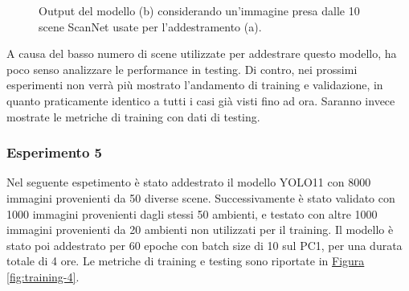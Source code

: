 \documentclass[12pt]{report}
\begin{document}
\begin{figure}[h!]
	\centering
	\hspace{0.01\textwidth}
	\caption{Output del modello (b) considerando un'immagine presa dalle 10 scene ScanNet usate per l'addestramento (a).}
	\label{fig:prediction-2}
\end{figure}

A causa del basso numero di scene utilizzate per addestrare questo modello, ha poco senso analizzare le performance in testing. Di contro, nei prossimi esperimenti non verrà più mostrato l'andamento di training e validazione, in quanto praticamente identico a tutti i casi già visti fino ad ora. Saranno invece mostrate le metriche di training con dati di testing.

\subsubsection{Esperimento 5}
\label{sec:esperimento_5}

Nel seguente espetimento è stato addestrato il modello YOLO11 con 8000 immagini provenienti da 50 diverse scene. Successivamente è stato validato con 1000 immagini provenienti dagli stessi 50 ambienti, e testato con altre 1000 immagini provenienti da 20 ambienti non utilizzati per il training. Il modello è stato poi addestrato per 60 epoche con batch size di 10 sul PC1, per una durata totale di 4 ore. Le metriche di training e testing sono riportate in \hyperref[fig:training-4]{Figura \ref{fig:training-4}}.
\end{document}
